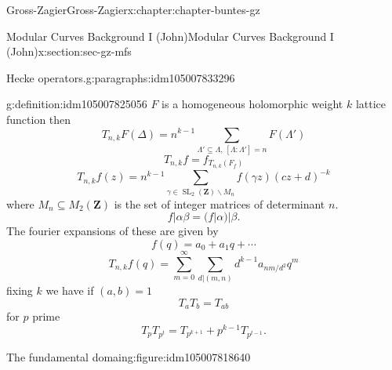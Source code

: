 \documentclass[oneside,10pt,]{book}
\numberwithin{equation}{section}
\newcommand{\ZZ}{\mathbf{Z}}
\DeclareMathOperator{\SL}{SL}
\begin{document}
\begin{chapterptx}{Gross-Zagier}{}{Gross-Zagier}{}{}{x:chapter:chapter-buntes-gz}
\begin{sectionptx}{Modular Curves Background I (John)}{}{Modular Curves Background I (John)}{}{}{x:section:sec-gz-mfs}
\begin{paragraphs}{Hecke operators.}{g:paragraphs:idm105007833296}
\begin{definition}{}{g:definition:idm105007825056}
\(F\) is a homogeneous holomorphic weight \(k\) lattice function then%
\begin{equation*}
T_{n,k} F(\Delta ) = n^{k-1} \sum_{\Lambda ' \subseteq \Lambda ,\,[\Lambda : \Lambda '] = n} F(\Lambda ')
\end{equation*}
%
\begin{equation*}
T_{n,k}f = f_{T_{n,k}(F_f)}
\end{equation*}
%
\begin{equation*}
T_{n,k} f(z) = n^{k-1} \sum_{\gamma \in \SL_2(\ZZ)\backslash  M_n } f(\gamma  z)(cz+d)^{-k}
\end{equation*}
where \(M_n \subseteq  M_2(\ZZ)\) is the set of integer matrices of determinant \(n\).%
\begin{equation*}
f|\alpha \beta = (f|\alpha )|\beta \text{.}
\end{equation*}
The fourier expansions of these are given by%
\begin{equation*}
f(q) = a_0 + a_1 q + \cdots
\end{equation*}
%
\begin{equation*}
T_{n,k}f(q) = \sum_{m = 0}^\infty \sum_{d|(m,n)} d^{k-1} a_{nm/d^2} q^m
\end{equation*}
fixing \(k\) we have if \((a,b) = 1\)%
\begin{equation*}
T_aT_b = T_{ab}
\end{equation*}
for \(p \) prime%
\begin{equation*}
T_p T_{p^t} = T_{p^{k+1}} + p^{k-1} T_{p^{t-1}}\text{.}
\end{equation*}
%
\end{definition}
\begin{figureptx}{The fundamental domain}{g:figure:idm105007818640}{}%
\begin{image}{0}{1}{0}%
\end{image}
\end{figureptx}
\end{paragraphs}
\end{sectionptx}
\end{chapterptx}
\end{document}
